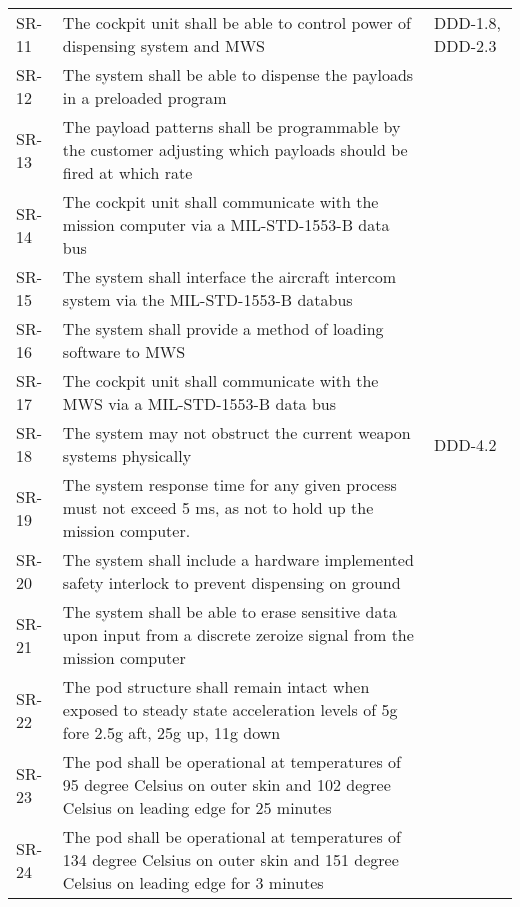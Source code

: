 \documentclass[Main]{subfiles}
\begin{document}
\begin{longtable}{p{} p{} p{}}
SR-11 & The cockpit unit shall be able to control power of dispensing system and MWS & DDD-1.8, DDD-2.3 \\

SR-12 & The system shall be able to dispense the payloads in a preloaded program &  \\

SR-13 & The payload patterns shall be programmable by the customer adjusting which payloads should be fired at which rate &  \\

SR-14 & The cockpit unit shall communicate with the mission computer via a MIL-STD-1553-B data bus &  \\

SR-15 & The system shall interface the aircraft intercom system via the MIL-STD-1553-B databus &  \\

SR-16 & The system shall provide a method of loading software to MWS &  \\

SR-17 & The cockpit unit shall communicate with the MWS via a MIL-STD-1553-B data bus &  \\

SR-18 & The system may not obstruct the current weapon systems physically & DDD-4.2 \\

SR-19 & The system response time for any given process must not exceed 5 ms, as not to hold up the mission computer. &  \\

SR-20 & The system shall include a hardware implemented safety interlock to prevent dispensing on ground &  \\

SR-21 & The system shall be able to erase sensitive data upon input from a discrete zeroize signal from the mission computer &  \\

SR-22 &  The pod structure shall remain intact when exposed to steady state acceleration levels of 5g fore 2.5g aft, 25g up, 11g down &  \\

SR-23 &  The pod shall be operational at temperatures of 95 degree Celsius on outer skin and 102 degree Celsius on leading edge for 25 minutes &  \\

SR-24 &  The pod shall be operational at temperatures of 134 degree Celsius on outer skin and 151 degree Celsius on leading edge for 3 minutes &  \\


\end{longtable}
\end{document}
